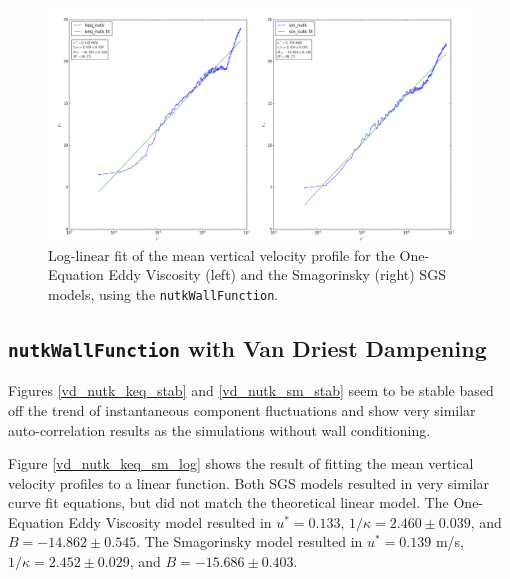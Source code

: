 \documentclass[12pt]{article}
\begin{document}
\begin{figure}[H]
\centering
\includegraphics[scale=0.35]{nutk/keq_sm_log.png}
\caption{Log-linear fit of the mean vertical velocity profile for the One-Equation Eddy Viscosity (left) and the Smagorinsky (right) SGS models, using the \texttt{nutkWallFunction}.}
\label{nutk_keq_sm_log}
\end{figure}

\subsection{\texttt{nutkWallFunction} with Van Driest Dampening}

Figures \ref{vd_nutk_keq_stab} and \ref{vd_nutk_sm_stab} seem to be stable based off the trend of instantaneous component fluctuations and show very similar auto-correlation results as the simulations without wall conditioning. 

Figure \ref{vd_nutk_keq_sm_log} shows the result of fitting the mean vertical velocity profiles to a linear function.  Both SGS models resulted in very similar curve fit equations, but did not match the theoretical linear model.  The One-Equation Eddy Viscosity model resulted in $u^* = 0.133$, $1/\kappa = 2.460 \pm 0.039$, and $B = -14.862 \pm 0.545$.  The Smagorinsky model resulted in $u^* = 0.139$ m/s, $1/\kappa = 2.452 \pm 0.029$, and $B = -15.686 \pm 0.403$.
\end{document}
